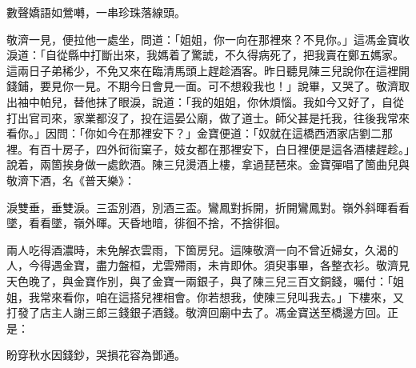 \begin{myquote}
數聲嬌語如鶯囀，一串珍珠落線頭。
\end{myquote}

敬濟一見，便拉他一處坐，問道：「姐姐，你一向在那裡來？不見你。」這馮金寶收淚道：「自從縣中打斷出來，我媽着了驚諕，不久得病死了，把我賣在鄭五媽家。這兩日子弟稀少，不免又來在臨清馬頭上趕趁酒客。昨日聽見陳三兒說你在這裡開錢鋪，要見你一見。不期今日會見一面。可不想殺我也！」說畢，又哭了。敬濟取出袖中帕兒，替他抹了眼淚，說道：「我的姐姐，你休煩惱。我如今又好了，{}自從打出官司來，家業都沒了，投在這晏公廟，做了道士。師父甚是托我，往後我常來看你。」因問：「你如今在那裡安下？」金寶便道：「奴就在這橋西洒家店劉二那裡。有百十房子，四外衏䘕窠子，妓女都在那裡安下，白日裡便是這各酒樓趕趁。」說着，兩箇挨身做一處飲酒。陳三兒燙酒上樓，拿過琵琶來。金寶彈唱了箇曲兒與敬濟下酒，名《普天樂》：

\begin{myquote}
淚雙垂，垂雙淚。三盃別酒，別酒三盃。鸞鳳對拆開，折開鸞鳳對。嶺外斜暉看看墜，看看墜，嶺外暉。天昏地暗，徘徊不捨，不捨徘徊。
\end{myquote}

兩人吃得酒濃時，未免解衣雲雨，下箇房兒。這陳敬濟一向不曾近婦女，久渴的人，今得遇金寶，盡力盤桓，尤雲殢雨，未肯即休。須臾事畢，各整衣衫。敬濟見天色晚了，與金寶作別，與了金寶一兩銀子，與了陳三兒三百文銅錢，囑付：「姐姐，我常來看你，咱在這搭兒裡相會。你若想我，使陳三兒叫我去。」{}下樓來，又打發了店主人謝三郎三錢銀子酒錢。敬濟回廟中去了。馮金寶送至橋邊方回。正是：

\begin{myquote}
盼穿秋水因錢鈔，哭損花容為鄧通。
\end{myquote}

